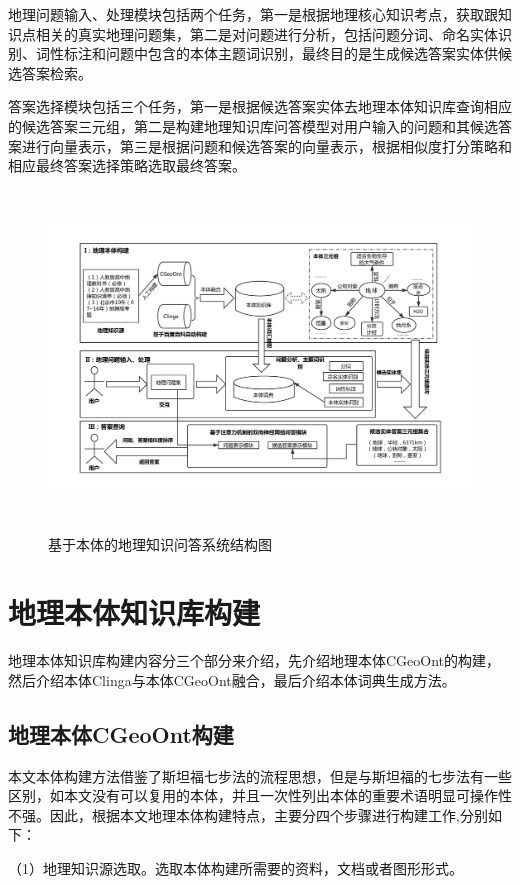 地理问题输入、处理模块包括两个任务，第一是根据地理核心知识考点，获取跟知识点相关的真实地理问题集，第二是对问题进行分析，包括问题分词、命名实体识别、词性标注和问题中包含的本体主题词识别，最终目的是生成候选答案实体供候选答案检索。

答案选择模块包括三个任务，第一是根据候选答案实体去地理本体知识库查询相应的候选答案三元组，第二是构建地理知识库问答模型对用户输入的问题和其候选答案进行向量表示，第三是根据问题和候选答案的向量表示，根据相似度打分策略和相应最终答案选择策略选取最终答案。

\begin{figure}[!htb]
	\centering\includegraphics[height=9cm]{resource/graduation}
	\caption{基于本体的地理知识问答系统结构图}
	\label{fig:graduation}
\end{figure}

\section{地理本体知识库构建}
地理本体知识库构建内容分三个部分来介绍，先介绍地理本体CGeoOnt的构建，然后介绍本体Clinga与本体CGeoOnt融合，最后介绍本体词典生成方法。

\subsection{地理本体CGeoOnt构建}\label{section:CGeoOnt_build}
本文本体构建方法借鉴了斯坦福七步法的流程思想，但是与斯坦福的七步法有一些区别，如本文没有可以复用的本体，并且一次性列出本体的重要术语明显可操作性不强。因此，根据本文地理本体构建特点，主要分四个步骤进行构建工作,分别如下：

（1）地理知识源选取。选取本体构建所需要的资料，文档或者图形形式。

